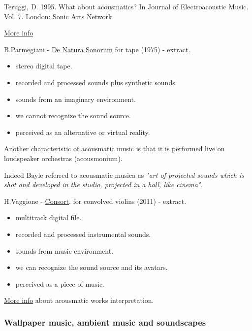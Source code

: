 Teruggi, D. 1995. What about acousmatics? In Journal of Electroacoustic
Music. Vol. 7. London: Sonic Arts Network

\href{http://www.musicaecodice.it/gitmedia/emc/2_media/teruggi.pdf}{More info}

B.Parmegiani - \href{http://www.musicaecodice.it/gitmedia/emc/2_media/parmegiani.mp3}{De Natura Sonorum} for tape (1975) - extract.

\begin{itemize}
\tightlist
\item stereo digital tape.
\item recorded and processed sounds plus synthetic sounds.
\item sounds from an imaginary environment.
\item we cannot recognize the sound source.
\item perceived as an alternative or virtual reality.
\end{itemize}

Another characteristic of acousmatic music is that it is performed live on loudspeaker orchestras (acousmonium).

Indeed Bayle referred to acousmatic musica as \textit{"art of projected sounds which is shot and developed in the studio, projected in a hall, like cinema".}

H.Vaggione - \href{http://www.musicaecodice.it/gitmedia/emc/2_media/vaggione.mp3}{Consort}. for convolved violins (2011) - extract.

\begin{itemize}
\tightlist
\item multitrack digital file.
\item recorded and processed instrumental sounds.
\item sounds from music environment.
\item we can recognize the sound source and its avatars.
\item perceived as a piece of music.
\end{itemize}

\href{http://www.musicaecodice.it/gitmedia/emc/2_media/space.pdf}{More info} about acousmatic works interpretation.

\subsubsection{Wallpaper music, ambient music and soundscapes }\label{wallpaper-music-ambient-music-and-soundscapes}


